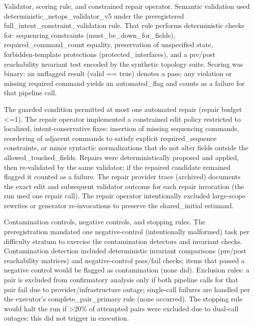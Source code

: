 \documentclass[conference]{IEEEtran}
\begin{document}
Validator, scoring rule, and constrained repair operator. Semantic validation used deterministic\_netops\_validator\_v5 under the preregistered full\_intent\_constraint\_validation rule. That rule performs deterministic checks for: sequencing constraints (must\_be\_down\_for\_fields), required\_command\_count equality, preservation of unspecified state, forbidden‑template protections (protected\_interfaces), and a pre/post reachability invariant test encoded by the synthetic topology suite. Scoring was binary: an unflagged result (valid == true) denotes a pass; any violation or missing required command yields an automated\_flag and counts as a failure for that pipeline call.

The guarded condition permitted at most one automated repair (repair budget <=1). The repair operator implemented a constrained edit policy restricted to localized, intent‑conservative fixes: insertion of missing sequencing commands, reordering of adjacent commands to satisfy explicit required\_sequence constraints, or minor syntactic normalizations that do not alter fields outside the allowed\_touched\_fields. Repairs were deterministically proposed and applied, then re‑validated by the same validator; if the repaired candidate remained flagged it counted as a failure. The repair provider trace (archived) documents the exact edit and subsequent validator outcome for each repair invocation (the run used one repair call). The repair operator intentionally excluded large‑scope rewrites or generator re‑invocations to preserve the shared\_initial estimand.

Contamination controls, negative controls, and stopping rules. The preregistration mandated one negative‑control (intentionally malformed) task per difficulty stratum to exercise the contamination detectors and invariant checks. Contamination detection included deterministic invariant comparisons (pre/post reachability matrices) and negative‑control pass/fail checks; items that passed a negative control would be flagged as contamination (none did). Exclusion rules: a pair is excluded from confirmatory analysis only if both pipeline calls for that pair fail due to provider/infrastructure outage; single-call failures are handled per the executor's complete\_pair\_primary rule (none occurred). The stopping rule would halt the run if >20\% of attempted pairs were excluded due to dual‑call outages; this did not trigger in execution.
\end{document}
